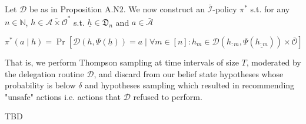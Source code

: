 \documentclass[a4paper]{article}
\newcommand{\Nats}{\mathbb{N}}
\newcommand{\Ob}{\mathcal{O}}
\newcommand{\A}{\mathcal{A}}
\newcommand{\In}{\mathcal{I}}
\newcommand{\Ado}{\bar{\Ob}}
\newcommand{\Ada}{\bar{\A}}
\newcommand{\Adi}{{\bar{\In}}}
\newcommand{\Adao}{\overline{\A \times \Ob}}
\newcommand{\Adfh}{\Adao^*}
\newcommand{\D}{\mathcal{D}}
\newcommand{\Do}{\mathfrak{D}}
\begin{document}
Let $\D$ be as in Proposition A.N2. We now construct an $\Adi$-policy $\pi^*$ s.t. for any $n \in \Nats$, $h \in \Adfh$ s.t. $\underline{h} \in \Do_n$ and $a \in \Ada$

$$\pi^*(a \mid h)=\Pr\left[\D\left(h,\Psi\left(\underline{h}\right)\right)=a \mid \forall m \in [n]: h_m \in \D\left(h_{:m},\Psi\left(\underline{h_{:m}}\right)\right) \times \Ado\right]$$

That is, we perform Thompson sampling at time intervals of size $T$, moderated by the delegation routine $\D$, and discard from our belief state hypotheses whose probability is below $\delta$ and hypotheses sampling which resulted in recommending "unsafe" actions i.e. actions that $\D$ refused to perform.

TBD
\end{document}
